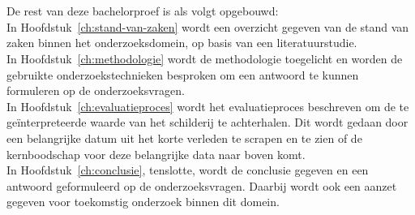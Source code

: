 \section{}%
\label{sec:opzet-bachelorproef}


De rest van deze bachelorproef is als volgt opgebouwd: \\

In Hoofdstuk~\ref{ch:stand-van-zaken} wordt een overzicht gegeven van de stand van zaken binnen het onderzoeksdomein, op basis van een literatuurstudie. \\
In Hoofdstuk~\ref{ch:methodologie} wordt de methodologie toegelicht en worden de gebruikte onderzoekstechnieken besproken om een antwoord te kunnen formuleren op de onderzoeksvragen. \\
In Hoofdstuk~\ref{ch:evaluatieproces} wordt het evaluatieproces beschreven om de te geïnterpreteerde waarde van het schilderij te achterhalen. Dit wordt gedaan door een belangrijke datum uit het korte verleden te scrapen en te zien of de kernboodschap voor deze belangrijke data naar boven komt. \\
In Hoofdstuk~\ref{ch:conclusie}, tenslotte, wordt de conclusie gegeven en een antwoord geformuleerd op de onderzoeksvragen. Daarbij wordt ook een aanzet gegeven voor toekomstig onderzoek binnen dit domein.